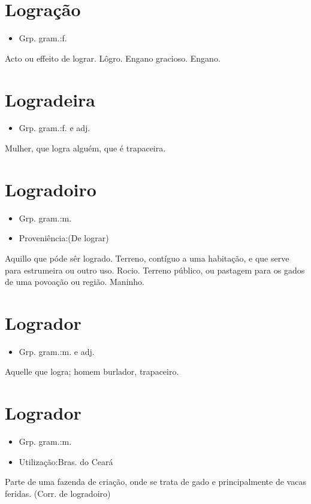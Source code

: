 \section{Logração}
\begin{itemize}
\item {Grp. gram.:f.}
\end{itemize}
Acto ou effeito de lograr.
Lôgro.
Engano gracioso.
Engano.
\section{Logradeira}
\begin{itemize}
\item {Grp. gram.:f.  e  adj.}
\end{itemize}
Mulher, que logra alguém, que é trapaceira.
\section{Logradoiro}
\begin{itemize}
\item {Grp. gram.:m.}
\end{itemize}
\begin{itemize}
\item {Proveniência:(De \textunderscore lograr\textunderscore )}
\end{itemize}
Aquillo que póde sêr logrado.
Terreno, contíguo a uma habitação, e que serve para estrumeira ou outro uso.
Rocio.
Terreno público, ou pastagem para os gados de uma povoação ou região.
Maninho.
\section{Logrador}
\begin{itemize}
\item {Grp. gram.:m.  e  adj.}
\end{itemize}
Aquelle que logra; homem burlador, trapaceiro.
\section{Logrador}
\begin{itemize}
\item {Grp. gram.:m.}
\end{itemize}
\begin{itemize}
\item {Utilização:Bras. do Ceará}
\end{itemize}
Parte de uma fazenda de criação, onde se trata de gado e principalmente de vacas feridas.
(Corr. de \textunderscore logradoiro\textunderscore )

